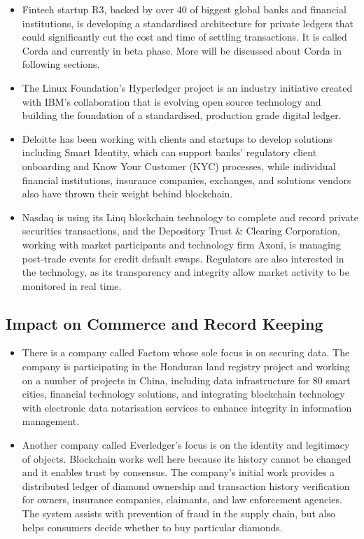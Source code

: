 \begin{itemize}
    \item Fintech startup R3, backed by over 40 of biggest global banks and financial institutions, is developing a standardised architecture for private ledgers that could significantly cut the cost and time of settling transactions\cite{Brown2016Corda:Introduction}. It is called Corda and currently in beta phase. More will be discussed about Corda in following sections.
    \item The Linux Foundation's Hyperledger project is an industry initiative created with IBM's collaboration that is evolving open source technology and building the foundation of a standardised, production grade digital ledger\cite{IBM2015LinuxTechnology}.
    \item Deloitte has been working with clients and startups to develop solutions including Smart Identity, which can support banks’ regulatory client onboarding and Know Your Customer (KYC) processes, while individual financial institutions, insurance companies, exchanges, and solutions vendors also have thrown their weight behind blockchain\cite{Chollet2017DeloitteRelease}.
    \item Nasdaq is using its Linq blockchain technology to complete and record private securities transactions, and the Depository Trust \& Clearing Corporation, working with market participants and technology firm Axoni, is managing post-trade events for credit default swaps. Regulators are also interested in the technology, as its transparency and integrity allow market activity to be monitored in real time\cite{Briganti2015NasdaqBlockchain}. 
\end{itemize}


\subsection{Impact on Commerce and Record Keeping}
\begin{itemize}
    \item There is a company called Factom whose sole focus is on securing data. The company is participating in the Honduran land registry project and working on a number of projects in China, including data infrastructure for 80 smart cities, financial technology solutions, and integrating blockchain technology with electronic data notarisation services to enhance integrity in information management. 
    \item Another company called Everledger’s focus is on the identity and legitimacy of objects. Blockchain works well here because its history cannot be changed and it enables trust by consensus. The company’s initial work provides a distributed ledger of diamond ownership and transaction history verification for owners, insurance companies, claimants, and law enforcement agencies. The system assists with prevention of fraud in the supply chain, but also helps consumers decide whether to buy particular diamonds.
\end{itemize}

